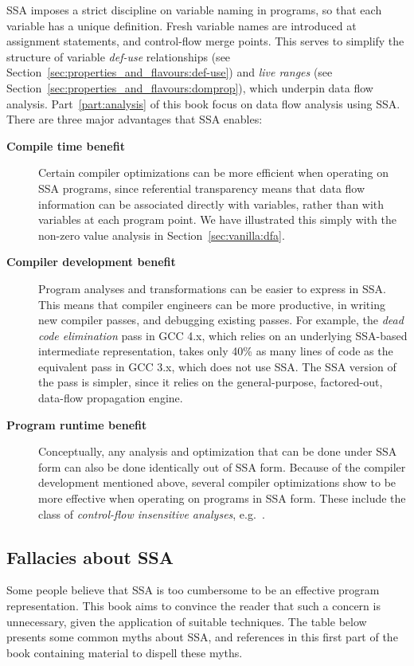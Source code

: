 SSA imposes a strict discipline on variable naming in programs,
so that each variable has a unique definition.
Fresh variable names are introduced at assignment statements,
and control-flow merge points.
This serves to simplify the structure of variable \emph{def-use} 
relationships (see Section~\ref{sec:properties_and_flavours:def-use}) 
and \emph{live ranges} (see Section~\ref{sec:properties_and_flavours:domprop}),
which underpin data flow analysis. Part~\ref{part:analysis} of this book focus
on data flow analysis using SSA. There are three major advantages that SSA enables:
\begin{description}
\item[\textbf{Compile time benefit}]
Certain compiler optimizations can be more efficient
when operating on SSA programs, since
referential transparency means that data flow information
can be associated directly with variables, rather than with variables
at each program point. We have illustrated this simply with the
non-zero value analysis in Section~\ref{sec:vanilla:dfa}.
\item[\textbf{Compiler development benefit}]
Program analyses and transformations can be easier
to express in SSA. This means that compiler engineers
can be more productive, in writing new compiler passes,
and debugging existing passes.
For example, the \textit{dead code elimination} pass
in GCC 4.x, which relies on an underlying SSA-based intermediate
representation, takes only 40\% as many lines of code
as the equivalent pass in GCC 3.x, which does not use SSA.
The SSA version of the pass is simpler, since it
relies on the general-purpose, factored-out, data-flow propagation
engine.
\item[\textbf{Program runtime benefit}]
Conceptually, any analysis and optimization that can be done under SSA form can also be done identically out of SSA form. Because of the compiler development mentioned above, several compiler optimizations show to be more effective
when operating on programs in SSA form. These include the
class of \textit{control-flow insensitive analyses}, e.g.\
\cite{hasti98using}.
\end{description}


\subsection{Fallacies about SSA}

Some people believe that SSA is too cumbersome to be an effective
program representation. 
This book aims to convince the reader that
such a concern is
unnecessary,
given the application of suitable techniques.
The table below presents some common myths
about SSA,
and references in this
first part of the book 
containing material to dispell
these myths.

